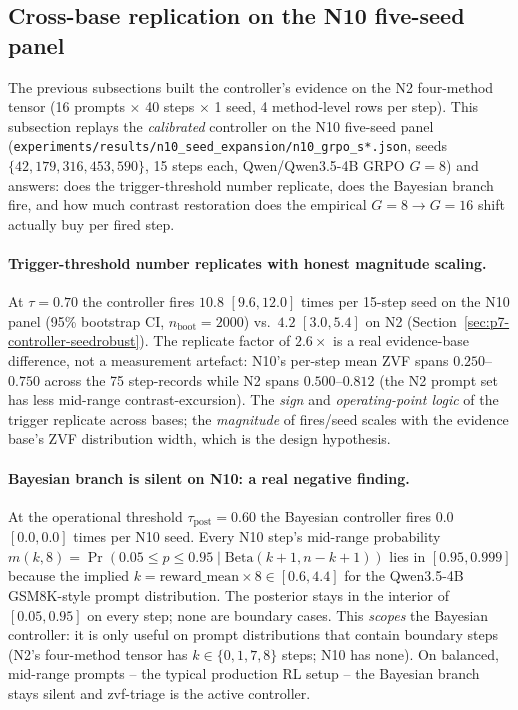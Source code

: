 \subsection{Cross-base replication on the N10 five-seed panel}
\label{sec:p7-controller-n10repl}
The previous subsections built the controller's evidence on the N2
four-method tensor (16 prompts $\times$ 40 steps $\times$ 1 seed,
4 method-level rows per step). This subsection replays the
\emph{calibrated} controller on the N10 five-seed panel
(\texttt{experiments/results/n10\_seed\_expansion/n10\_grpo\_s*.json},
seeds $\{42, 179, 316, 453, 590\}$, 15 steps each, Qwen/Qwen3.5-4B
GRPO $G{=}8$) and answers: does the trigger-threshold number
replicate, does the Bayesian branch fire, and how much contrast
restoration does the empirical $G{=}8 \to G{=}16$ shift actually
buy per fired step.

\paragraph{Trigger-threshold number replicates with honest
magnitude scaling.}
At $\tau{=}0.70$ the controller fires $10.8$ $[9.6, 12.0]$ times
per 15-step seed on the N10 panel (95\% bootstrap CI, $n_{\text{boot}}{=}2000$)
vs.\ $4.2$ $[3.0, 5.4]$ on N2 (Section~\ref{sec:p7-controller-seedrobust}).
The replicate factor of $2.6\times$ is a real evidence-base
difference, not a measurement artefact: N10's per-step mean ZVF
spans $0.250$--$0.750$ across the 75 step-records while N2 spans
$0.500$--$0.812$ (the N2 prompt set has less mid-range
contrast-excursion). The \emph{sign} and \emph{operating-point
logic} of the trigger replicate across bases; the \emph{magnitude}
of fires/seed scales with the evidence base's ZVF distribution
width, which is the design hypothesis.

\paragraph{Bayesian branch is silent on N10: a real negative finding.}
At the operational threshold $\tau_{\text{post}}{=}0.60$ the
Bayesian controller fires $0.0$ $[0.0, 0.0]$ times per N10 seed.
Every N10 step's mid-range probability
$m(k, 8) = \Pr(0.05 \le p \le 0.95 \mid \mathrm{Beta}(k{+}1, n{-}k{+}1))$
lies in $[0.95, 0.999]$ because the implied $k = \mathrm{reward\_mean}
\times 8 \in [0.6, 4.4]$ for the Qwen3.5-4B GSM8K-style prompt
distribution. The posterior stays in the interior of $[0.05, 0.95]$
on every step; none are boundary cases. This \emph{scopes} the
Bayesian controller: it is only useful on prompt distributions that
contain boundary steps (N2's four-method tensor has $k \in \{0, 1,
7, 8\}$ steps; N10 has none). On balanced, mid-range prompts --
the typical production RL setup -- the Bayesian branch stays
silent and zvf-triage is the active controller.

